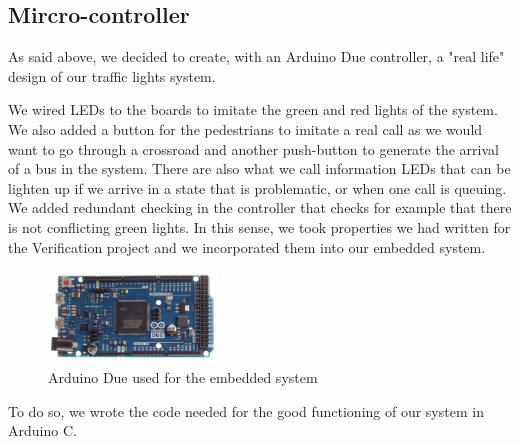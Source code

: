 \subsection{Mircro-controller}
As said above, we decided to create, with an Arduino Due controller, a "real life" design of our traffic lights system.

We wired LEDs to the boards to imitate the green and red lights of the system. We also added a button for the pedestrians to imitate a real call as we would want to go through a crossroad and another push-button to generate the arrival of a bus in the system. There are also what we call information LEDs that can be lighten up if we arrive in a state that is problematic, or when one call is queuing. 
We added redundant checking in the controller that checks for example that there is not conflicting green lights. In this sense, we took properties we had written for the Verification project and we incorporated them into our embedded system.

\begin{figure}[H]
	\label{fig:arduino}
  	\centering
    \includegraphics[width=0.4\textwidth]{picture/arduino.jpg}
    \caption{Arduino Due used for the embedded system}
\end{figure} 

To do so, we wrote the code needed for the good functioning of our system in Arduino C.